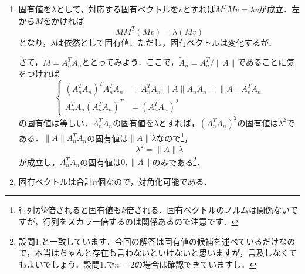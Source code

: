 \documentclass[a4paper,pdflatex,ja=standard]{bxjsarticle}
\begin{document}
\begin{enumerate}
  \item 
  固有値を$\lambda$として，対応する固有ベクトルを$v$とすれば$M^{T}Mv=\lambda v$が成立．左から$M$をかければ
  \begin{equation}
    MM^{T}(Mv)
    =
    \lambda (Mv)
  \end{equation}
  となり，$\lambda$は依然として固有値．ただし，固有ベクトルは変化するが．

  さて，$M=A_{n}^{T}A_{n}$ととってみよう．ここで，$\tilde{A}_{n}=A_{n}^{T}/\|A\|$であることに気をつければ
  \begin{equation}
    \left\{
      \begin{alignedat}{1}
        (A_{n}^{T}A_{n})^{T}A_{n}^{T}A_{n}
        &=
        A_{n}^{T}A_{n}\cdot\|A\| \tilde{A}_{n}A_{n}
        =
        \|A\|A_{n}^{T}A_{n}
        \\
        A_{n}^{T}A_{n}(A_{n}^{T}A_{n})^{T}
        &=
        (A_{n}^{T}A_{n})^2
      \end{alignedat}
    \right.
  \end{equation}
  の固有値は等しい．$A_{n}^{T}A_{n}$の固有値を$\lambda$とすれば，$(A_{n}^{T}A_{n})^2$の固有値は$\lambda^2$である．$\|A\|A_{n}^{T}A_{n}$の固有値は$\|A\|\lambda$なので\footnote{
    行列が$k$倍されると固有値も$k$倍される．固有ベクトルのノルムは関係ないですが，行列をスカラー倍するのは関係あるので注意です．
  }，
  \begin{equation}
    \lambda^2=\|A\|\lambda
  \end{equation}
  が成立し，$A_{n}^{T}A_{n}$の固有値は$0,\|A\|$のみである\footnote{
    設問1.と一致しています．今回の解答は固有値の候補を述べているだけなので，本当はちゃんと存在も言わないといけないと思いますが，言及しなくてもよいでしょう．設問1.で$n=2$の場合は確認できていますし．
  }．

  \item   
  固有ベクトルは合計$n$個なので，対角化可能である．

\end{enumerate}
\end{document}

